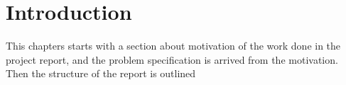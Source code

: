 \chapter{Introduction}
\label{ch:introduction}
This chapters starts with a section about motivation of the work done in the project report,
and the problem specification is arrived from the motivation.
Then the structure of the report is outlined




